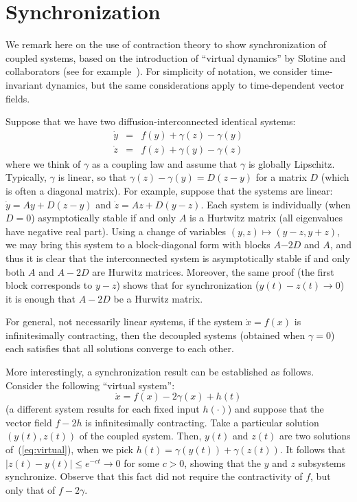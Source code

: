 \documentclass{svmult}
\newcommand{\abs}[1]{\left\vert #1 \right\vert}
\newcommand{\be}[1]{\begin{equation}\label{#1}}
\newcommand{\ee}{\end{equation}}
\newcommand{\beqn}{\begin{eqnarray*}}
\newcommand{\eeqn}{\end{eqnarray*}}
\newcommand{\cc}{c}
\begin{document}
\section{Synchronization}
\label{sec:synch}

We remark here on the use of contraction theory to show synchronization of
coupled systems,
based on the introduction of ``virtual dynamics'' by Slotine
and collaborators (see for example~\cite{russo_dibernardo_ieee_cas2009}).
For simplicity of notation, we consider time-invariant dynamics,
but the same considerations apply to time-dependent vector fields.

Suppose that we have two diffusion-interconnected identical systems:
\beqn
\dot y&=& f(y) + \gamma (z) - \gamma (y)\\
\dot z&=& f(z) + \gamma (y) - \gamma (z)
\eeqn
where we think of $\gamma $ as a coupling law and assume that $\gamma $ is globally
Lipschitz. 
Typically, $\gamma $ is linear, so that $\gamma (z) - \gamma (y) = D(z-y)$ for a matrix $D$
(which is often a diagonal matrix).
For example, suppose that the systems are linear:
$\dot y= Ay + D(z-y)$ and $\dot z= Az + D(y-z)$.
Each system is individually (when $D=0$) asymptotically stable if and only
$A$ is a Hurtwitz matrix (all eigenvalues have negative real part).
Using a change of variables $(y,z) \mapsto  (y-z,y+z)$, we may bring this system to
a block-diagonal form with blocks
$A$$-$$2D$ and $A$,
and thus it is clear that the interconnected system is 
asymptotically stable if and only both $A$ and $A-2D$ are Hurwitz matrices.
Moreover, the same proof (the first block corresponds to $y-z$) shows that
for synchronization ($y(t)-z(t) \rightarrow 0$) it is enough that $A-2D$ be a
Hurwitz matrix.

For general, not necessarily linear systems, if the system $\dot x=f(x)$ is
infinitesimally contracting, then the decoupled systems (obtained when $\gamma =0$)
each satisfies that all solutions converge to each other.

More interestingly, a synchronization result can be established as follows.
Consider the following ``virtual system'':
\be{eq:virtual}
\dot x = f(x) - 2\gamma (x) + h(t)
\ee
(a different system results for each fixed input $h(\cdot )$)
and suppose that the vector field $f - 2h$ is infinitesimally contracting.
Take a particular solution $(y(t),z(t))$ of the coupled system.
Then, $y(t)$ and $z(t)$ are two solutions of~(\ref{eq:virtual}), when we pick
$h(t) = \gamma (y(t)) + \gamma (z(t))$.
It follows that
$\abs{z(t)-y(t)} \leq e^{-\cc t} \rightarrow  0$ for some $c>0$,
showing that the $y$ and $z$ subsystems synchronize.
Observe that this fact did not require the contractivity of $f$, but only
that of $f-2\gamma $.
\end{document}
